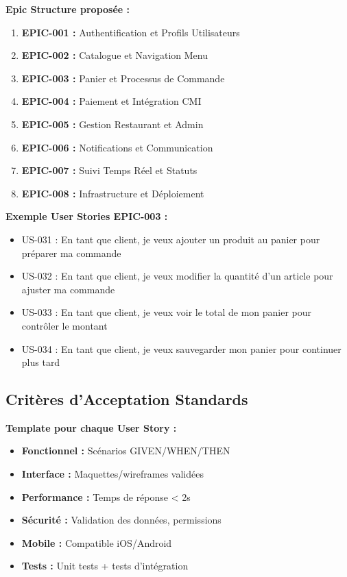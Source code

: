 \documentclass[11pt,a4paper]{article}
\begin{document}
\textbf{Epic Structure proposée :}
\begin{enumerate}
    \item \textbf{EPIC-001 :} Authentification et Profils Utilisateurs
    \item \textbf{EPIC-002 :} Catalogue et Navigation Menu
    \item \textbf{EPIC-003 :} Panier et Processus de Commande
    \item \textbf{EPIC-004 :} Paiement et Intégration CMI
    \item \textbf{EPIC-005 :} Gestion Restaurant et Admin
    \item \textbf{EPIC-006 :} Notifications et Communication
    \item \textbf{EPIC-007 :} Suivi Temps Réel et Statuts
    \item \textbf{EPIC-008 :} Infrastructure et Déploiement
\end{enumerate}

\textbf{Exemple User Stories EPIC-003 :}
\begin{itemize}
    \item US-031 : En tant que client, je veux ajouter un produit au panier pour préparer ma commande
    \item US-032 : En tant que client, je veux modifier la quantité d'un article pour ajuster ma commande
    \item US-033 : En tant que client, je veux voir le total de mon panier pour contrôler le montant
    \item US-034 : En tant que client, je veux sauvegarder mon panier pour continuer plus tard
\end{itemize}

\subsection{Critères d'Acceptation Standards}

\textbf{Template pour chaque User Story :}
\begin{itemize}
    \item \textbf{Fonctionnel :} Scénarios GIVEN/WHEN/THEN
    \item \textbf{Interface :} Maquettes/wireframes validées
    \item \textbf{Performance :} Temps de réponse < 2s
    \item \textbf{Sécurité :} Validation des données, permissions
    \item \textbf{Mobile :} Compatible iOS/Android
    \item \textbf{Tests :} Unit tests + tests d'intégration
\end{itemize}
\end{document}
